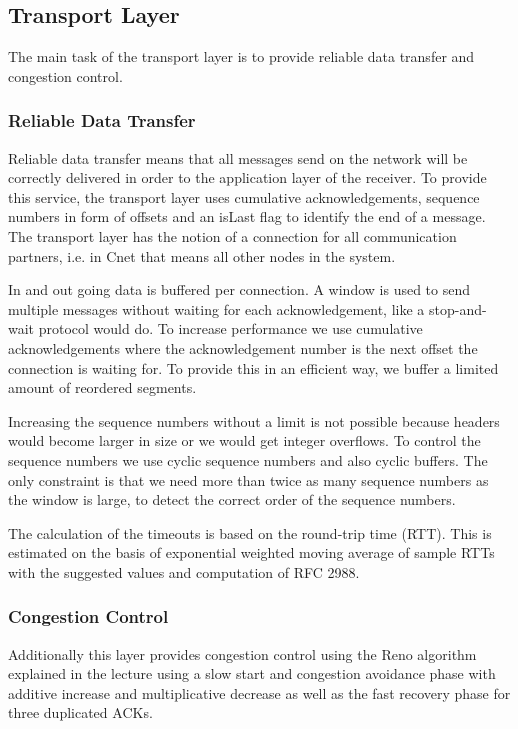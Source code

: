 \subsection{Transport Layer}
  The main task of the transport layer is to provide reliable data transfer and congestion control.

  \subsubsection{Reliable Data Transfer}
  Reliable data transfer means that all messages send on the network will be correctly delivered in order to the application layer of the receiver. To provide this service, the transport layer uses cumulative acknowledgements, sequence numbers in form of offsets and an isLast flag to identify the end of a message. The transport layer has the notion of a connection for all communication partners, i.e. in Cnet that means all other nodes in the system.
  
  In and out going data is buffered per connection. A window is used to send multiple messages without waiting for each acknowledgement, like a stop-and-wait protocol would do. To increase performance we use cumulative acknowledgements where the acknowledgement number is the next offset the connection is waiting for. To provide this in an efficient way, we buffer a limited amount of reordered segments.
  
  Increasing the sequence numbers without a limit is not possible because headers would become larger in size or we would get integer overflows. To control the sequence numbers we use cyclic sequence numbers and also cyclic buffers. The only constraint is that we need more than twice as many sequence numbers as the window is large, to detect the correct order of the sequence numbers.
  
  The calculation of the timeouts is based on the round-trip time (RTT). This is estimated on the basis of exponential weighted moving average of sample RTTs with the suggested values and computation of RFC 2988.
  
  \subsubsection{Congestion Control}
  Additionally this layer provides congestion control using the Reno algorithm explained in the lecture using a slow start and congestion avoidance phase with additive increase and multiplicative decrease as well as the fast recovery phase for three duplicated ACKs.
  
